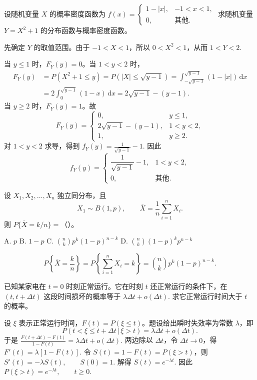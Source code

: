 \documentclass[lang=cn,11pt]{elegantbook}
\begin{document}
\begin{exercise}\label{exer:src-2004-2a-12}
设随机变量 \(X\) 的概率密度函数为
\(
f(x)=
\begin{cases}
1-|x|, & -1<x<1,\\
0, & \text{其他}.
\end{cases}
\)
求随机变量 \(Y=X^2+1\) 的分布函数与概率密度函数。
\end{exercise}
\begin{solution}
先确定 \(Y\) 的取值范围。由于 \(-1<X<1\)，所以 \(0<X^2<1\)，从而
\(
1<Y<2.
\)

当 \(y\le 1\) 时，\(F_Y(y)=0\)。当 \(1<y<2\) 时，
\[
\begin{aligned}
F_Y(y)
&=P(X^2+1\le y)
=P(|X|\le \sqrt{y-1})=\int_{-\sqrt{y-1}}^{\sqrt{y-1}}(1-|x|)\,\mathrm{d}x\\
&=2\int_0^{\sqrt{y-1}}(1-x)\,\mathrm{d}x=2\sqrt{y-1}-(y-1).
\end{aligned}
\]
当 \(y\ge 2\) 时，\(F_Y(y)=1\)。故
\[
F_Y(y)=
\begin{cases}
0, & y\le 1,\\
2\sqrt{y-1}-(y-1), & 1<y<2,\\
1, & y\ge 2.
\end{cases}
\]
对 \(1<y<2\) 求导，得到
\(
f_Y(y)=\frac{1}{\sqrt{y-1}}-1.
\)
因此
\[
f_Y(y)=
\begin{cases}
\dfrac{1}{\sqrt{y-1}}-1, & 1<y<2,\\
0, & \text{其他}.
\end{cases}
\]
\end{solution}


\begin{exercise}\label{exer:src-2009-07-3a-i-02}\label{exer:src-probstat-test1-i-02}
设 \(X_1,X_2,\dots,X_n\) 独立同分布，且
\[
X_1\sim B(1,p),\qquad \overline X=\frac1n\sum_{i=1}^n X_i.
\]
则 \(P\{\overline X=k/n\}=\)（\quad）。\par
A. \(p\)\quad
B. \(1-p\)\quad
C. \(\binom nk p^k(1-p)^{n-k}\)\quad
D. \(\binom nk(1-p)^k p^{n-k}\)
\end{exercise}
\begin{solution}
\[
P\left\{\overline X=\frac{k}{n}\right\}
=P\left\{\sum_{i=1}^{n}X_i=k\right\}
=\binom nk p^k(1-p)^{n-k}.
\]
\end{solution}


\begin{exercise}\label{exer:src-2010-a-04}
已知某家电在 \(t=0\) 时刻正常运行。它在时刻 \(t\) 还正常运行的条件下，在 \((t,t+\Delta t)\) 这段时间损坏的概率等于
\(
\lambda\Delta t+o(\Delta t).
\)
求它正常运行时间大于 \(t\) 的概率。
\end{exercise}
\begin{solution}
设 \(\xi\) 表示正常运行时间，\(F(t)=P(\xi\le t)\)。题设给出瞬时失效率为常数 \(\lambda\)，即
\[
P(t<\xi\le t+\Delta t\,|\,\xi>t)=\lambda\Delta t+o(\Delta t).
\]
于是
\(
\frac{F(t+\Delta t)-F(t)}{1-F(t)}
=\lambda\Delta t+o(\Delta t).
\)
两边除以 \(\Delta t\)，令 \(\Delta t\to0\)，得
\(
F'(t)=\lambda[1-F(t)].
\)
令 \(S(t)=1-F(t)=P(\xi>t)\)，则
\(
S'(t)=-\lambda S(t),\qquad S(0)=1.
\)
解得
\(
S(t)=e^{-\lambda t}.
\)
因此
\(
P(\xi>t)=e^{-\lambda t},\qquad t\ge0.
\)
\end{solution}
\end{document}
